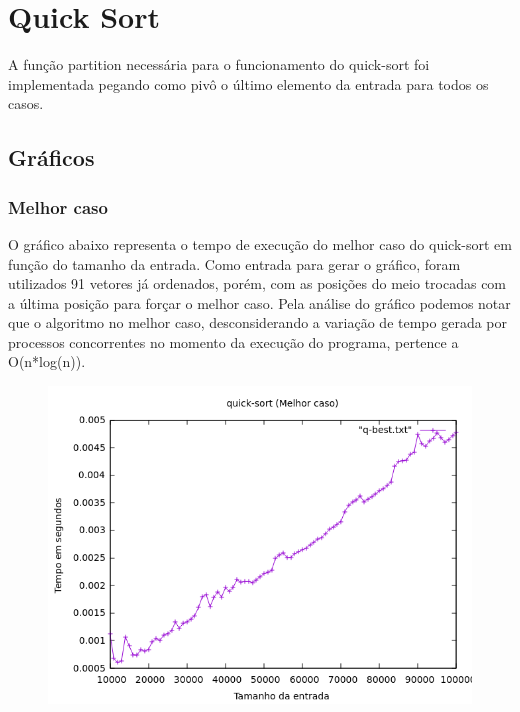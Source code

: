 \chapter{Quick Sort}
A função partition necessária para o funcionamento do quick-sort foi implementada pegando como pivô o último elemento da entrada para todos os casos.
\newpage
\section{Gráficos}
\subsection{Melhor caso}
O gráfico abaixo representa o tempo de execução do melhor caso do quick-sort em função do tamanho da entrada. Como entrada para gerar o gráfico, foram utilizados 91 vetores já ordenados, porém, com as posições do meio trocadas com a última posição para forçar o melhor caso. Pela análise do gráfico podemos notar que o algoritmo no melhor caso, desconsiderando a variação de tempo gerada por processos concorrentes no momento da execução do programa, pertence a O(n*log(n)).
\begin{figure}[h]
    \centering
    \includegraphics[width=1\linewidth]{Imagens/q-best.png}
\end{figure}

\newpage

